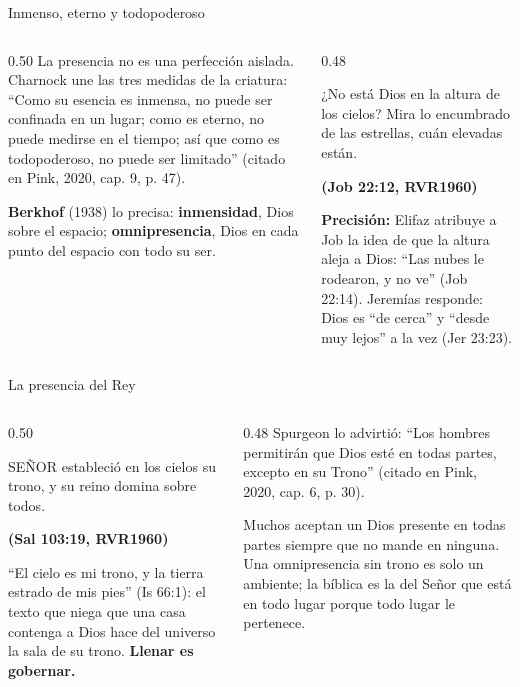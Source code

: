 \documentclass[hyperref={bookmarks=false},aspectratio=169]{beamer}
\newcommand{\SENOR}{S{\fontsize{0.78em}{1em}\selectfont EÑOR}}
\newcommand{\fuente}[1]{\par\hfill{\upshape\bfseries\footnotesize\textcolor{azul}{#1}}}
\newcommand{\destacar}[1]{\textbf{\textcolor{azul}{#1}}}
\newcommand{\precision}[1]{{\footnotesize\color{gris}\textbf{Precisión:} #1}}
\begin{document}
\begin{frame}{Inmenso, eterno y todopoderoso}
\begin{columns}[c,onlytextwidth]
\begin{column}{0.50\textwidth}\scriptsize
La presencia no es una perfección aislada. Charnock une las tres medidas de la criatura: ``Como su esencia es inmensa, no puede ser confinada en un lugar; como es eterno, no puede medirse en el tiempo; así que como es todopoderoso, no puede ser limitado'' (citado en Pink, 2020, cap. 9, p. 47).\par\medskip
\textbf{Berkhof} (1938) lo precisa: \destacar{inmensidad}, Dios sobre el espacio; \destacar{omnipresencia}, Dios en cada punto del espacio con todo su ser.
\end{column}
\begin{column}{0.48\textwidth}
\begin{cita}[fontupper=\scriptsize\itshape]¿No está Dios en la altura de los cielos? Mira lo encumbrado de las estrellas, cuán elevadas están.\fuente{(Job 22:12, RVR1960)}\end{cita}
\precision{Elifaz atribuye a Job la idea de que la altura aleja a Dios: ``Las nubes le rodearon, y no ve'' (Job 22:14). Jeremías responde: Dios es ``de cerca'' y ``desde muy lejos'' a la vez (Jer 23:23).}
\end{column}
\end{columns}
\end{frame}

\begin{frame}{La presencia del Rey}
\begin{columns}[c,onlytextwidth]
\begin{column}{0.50\textwidth}
\begin{cita}[fontupper=\scriptsize\itshape]\SENOR{} estableció en los cielos su trono, y su reino domina sobre todos.\fuente{(Sal 103:19, RVR1960)}\end{cita}
\scriptsize ``El cielo es mi trono, y la tierra estrado de mis pies'' (Is 66:1): el texto que niega que una casa contenga a Dios hace del universo la sala de su trono. \destacar{Llenar es gobernar.}
\end{column}
\begin{column}{0.48\textwidth}\scriptsize
Spurgeon lo advirtió: ``Los hombres permitirán que Dios esté en todas partes, excepto en su Trono'' (citado en Pink, 2020, cap. 6, p. 30).\par\medskip
Muchos aceptan un Dios presente en todas partes siempre que no mande en ninguna. Una omnipresencia sin trono es solo un ambiente; la bíblica es la del Señor que está en todo lugar porque todo lugar le pertenece.
\end{column}
\end{columns}
\end{frame}
\end{document}
